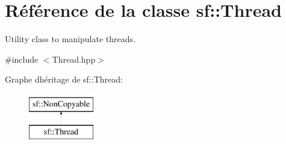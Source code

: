 \hypertarget{classsf_1_1Thread}{}\section{Référence de la classe sf\+:\+:Thread}
\label{classsf_1_1Thread}


Utility class to manipulate threads.  




{\ttfamily \#include $<$Thread.\+hpp$>$}

Graphe d\textquotesingle{}héritage de sf\+:\+:Thread\+:\begin{figure}[H]
\begin{center}
\leavevmode
\includegraphics[height=2.000000cm]{classsf_1_1Thread}
\end{center}
\end{figure}
